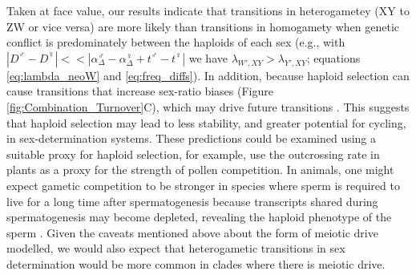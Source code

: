 \documentclass[12pt]{article}
\begin{document}
Taken at face value, our results indicate that transitions in heterogametey (XY to ZW or vice versa) are more likely than transitions in homogamety when genetic conflict is predominately between the haploids of each sex (e.g., with $|D^\male - D^\female| << |\alpha_\Delta^\male - \alpha_\Delta^\female + t^\male - t^\female|$ we have $\lambda_{W',XY} > \lambda_{Y',XY}$; equations \ref{eq:lambda_neoW} and \ref{eq:freq_diffs}). 
In addition, because haploid selection can cause transitions that increase sex-ratio biases (Figure \ref{fig:Combination_Turnover}C), which may drive future transitions \citep[e.g., the male biased sex-ratio at end of Figure \ref{fig:Combination_Turnover}C is the same as the sex ratio at the beginning of  Figure \ref{fig:Combination_Turnover}B, which helps the neo-W invade; see also][]{Ubeda:2015fx}.
This suggests that haploid selection may lead to less stability, and greater potential for cycling, in sex-determination systems. 
These predictions could be examined using a suitable proxy for haploid selection, for example, \cite{Lenormand:2005vb} use the outcrossing rate in plants as a proxy for the strength of pollen competition. 
In animals, one might expect gametic competition to be stronger in species where sperm is required to live for a long time after spermatogenesis because transcripts shared during spermatogenesis may become depleted, revealing the haploid phenotype of the sperm \citep{Immler:2014im}.
Given the caveats mentioned above about the form of meiotic drive modelled, we would also expect that heterogametic transitions in sex determination would be more common in clades where there is meiotic drive. 
\end{document}
